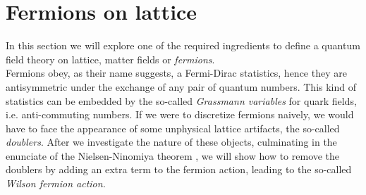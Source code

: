 \newpage

\section{Fermions on lattice}
In this section we will explore one of the required ingredients to define a quantum field theory on lattice, matter fields or \textit{fermions}. \\ Fermions obey, as their name suggests, a Fermi-Dirac statistics, hence they are antisymmetric under the exchange of any pair of quantum numbers. This kind of statistics can be embedded by the so-called \textit{Grassmann variables} for quark fields, i.e. anti-commuting numbers. If we were to discretize fermions naively, we would have to face the appearance of some unphysical lattice artifacts, the so-called \textit{doublers}. After we investigate the nature of these objects, culminating in the enunciate of the Nielsen-Ninomiya theorem \cite{NIELSEN198120}, we will show how to remove the doublers by adding an extra term to the fermion action, leading to the so-called \textit{Wilson fermion action.}

